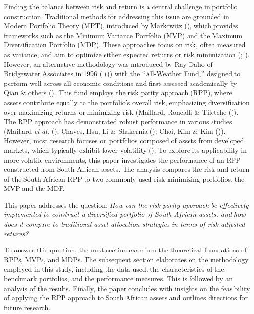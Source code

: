 \documentclass[11pt,preprint]{elsarticle}
\numberwithin{equation}{section}
\numberwithin{figure}{section}
\numberwithin{table}{section}
\begin{document}
Finding the balance between risk and return is a central challenge in
portfolio construction. Traditional methods for addressing this issue
are grounded in Modern Portfolio Theory (MPT), introduced by Markowitz
(), which
provides frameworks such as the Minimum Variance Portfolio (MVP) and the
Maximum Diversification Portfolio (MDP). These approaches focus on risk,
often measured as variance, and aim to optimize either expected returns
or risk minimization (; ). However, an alternative methodology was introduced by Ray Dalio
of Bridgewater Associates in 1996 (
()) with the ``All-Weather Fund,''
designed to perform well across all economic conditions and first
assessed academically by Qian \& others
(). This fund employs the risk parity
approach (RPP), where assets contribute equally to the portfolio's
overall risk, emphasizing diversification over maximizing returns or
minimizing risk (Maillard, Roncalli \& Tiletche
()). The RPP approach has
demonstrated robust performance in various studies (Maillard \emph{et
al.} (); Chaves, Hsu, Li \&
Shakernia (); Choi, Kim \& Kim
()). However, most research
focuses on portfolios composed of assets from developed markets, which
typically exhibit lower volatility
(). To explore its applicability in more volatile
environments, this paper investigates the performance of an RPP
constructed from South African assets. The analysis compares the risk
and return of the South African RPP to two commonly used risk-minimizing
portfolios, the MVP and the MDP.

This paper addresses the question: \emph{How can the risk parity
approach be effectively implemented to construct a diversified portfolio
of South African assets, and how does it compare to traditional asset
allocation strategies in terms of risk-adjusted returns?}

To answer this question, the next section examines the theoretical
foundations of RPPs, MVPs, and MDPs. The subsequent section elaborates
on the methodology employed in this study, including the data used, the
characteristics of the benchmark portfolios, and the performance
measures. This is followed by an analysis of the results. Finally, the
paper concludes with insights on the feasibility of applying the RPP
approach to South African assets and outlines directions for future
research.
\end{document}
